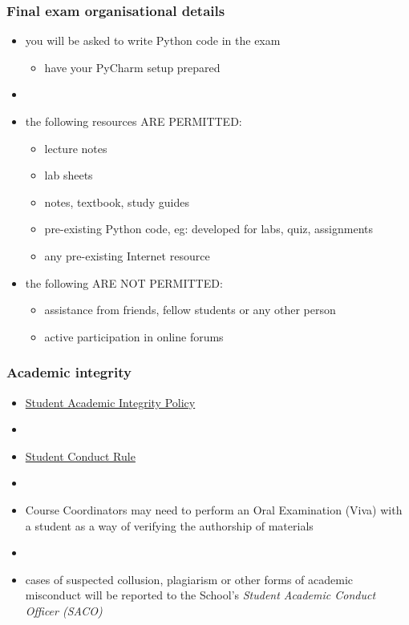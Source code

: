 \documentclass[english,14pt]{beamer}
\begin{document}
\begin{frame}[fragile]

\frametitle{Final exam organisational details}

\begin{itemize}
	\item you will be asked to write Python code in the exam
	\begin{itemize}
		\item have your PyCharm setup prepared
	\end{itemize}
	\item[]
	\item the following resources ARE PERMITTED:
	\begin{itemize}
		\item lecture notes
		\item lab sheets
		\item notes, textbook, study guides
		\item pre-existing Python code, eg: developed for labs, quiz, assignments
		\item any pre-existing Internet resource
	\end{itemize}

	\item the following ARE NOT PERMITTED:
	\begin{itemize}
		\item assistance from friends, fellow students or any other person
		\item active participation in online forums
	\end{itemize}
	
\end{itemize}

\end{frame}


\begin{frame}[fragile]

\frametitle{Academic integrity}

\begin{itemize}
	\item \href{https://policies.newcastle.edu.au/document/view-current.php?id=35&version=1}{Student Academic Integrity Policy}
	\item[]
	\item \href{https://policies.newcastle.edu.au/document/view-current.php?id=34}{Student Conduct Rule}
	\item[]
	\item Course Coordinators may need to perform an Oral Examination (Viva) with a student as a way of verifying the authorship of materials
	\item[]
	\item cases of suspected collusion, plagiarism or other forms of academic misconduct will be reported to the School's \emph{Student Academic Conduct Officer (SACO)}
\end{itemize}

\end{frame}
\end{document}
